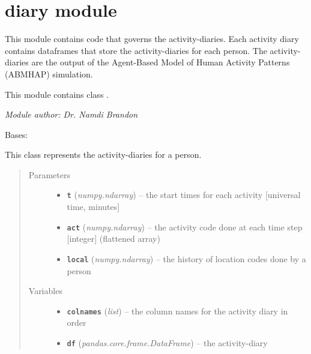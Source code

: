 \documentclass[letterpaper,10pt,english]{sphinxmanual}
\begin{document}
\section{diary module}
\label{diary::doc}\label{diary:module-diary}\label{diary:diary-module}
This module contains code that governs the activity-diaries. Each activity diary contains
dataframes that store the activity-diaries for each person. The activity-diaries are the
output of the Agent-Based Model of Human Activity Patterns (ABMHAP) simulation.

This module contains class {\hyperref[diary:diary.Diary]{\emph{}}}.

\emph{Module author: Dr. Namdi Brandon}

\begin{fulllineitems}
\label{diary:diary.Diary}
Bases: 

This class represents the activity-diaries for a person.
\begin{quote}\begin{description}
\item[{Parameters}] \leavevmode\begin{itemize}
\item {} 
\textbf{\texttt{t}} (\emph{numpy.ndarray}) -- the start times for each activity {[}universal time, minutes{]}

\item {} 
\textbf{\texttt{act}} (\emph{numpy.ndarray}) -- the activity code done at each time step {[}integer{]} (flattened array)

\item {} 
\textbf{\texttt{local}} (\emph{numpy.ndarray}) -- the history of location codes done by a person

\end{itemize}

\item[{Variables}] \leavevmode\begin{itemize}
\item {} 
\textbf{\texttt{colnames}} (\emph{list}) -- the column names for the activity diary in order

\item {} 
\textbf{\texttt{df}} (\emph{pandas.core.frame.DataFrame}) -- the activity-diary

\end{itemize}


\end{description}
\end{quote}
\end{fulllineitems}
\end{document}
